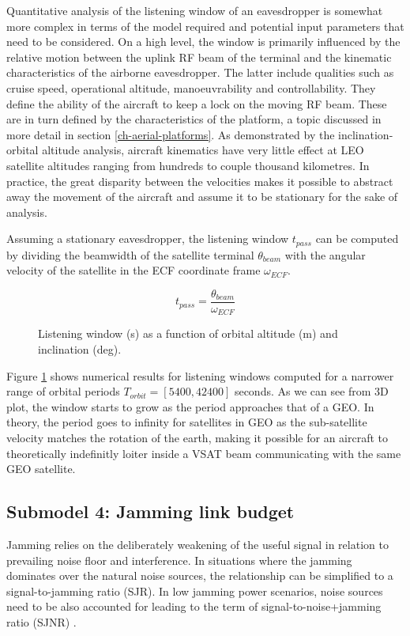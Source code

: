 \documentclass[english, 12pt, a4paper, elec, utf8, a-1b, online]{aaltothesis}
\begin{document}
Quantitative analysis of the listening window of an eavesdropper is somewhat more complex in terms of the model required and potential input parameters that need to be considered.
On a high level, the window is primarily influenced by the relative motion between the uplink RF beam of the terminal and the kinematic characteristics of the airborne eavesdropper.
The latter include qualities such as cruise speed, operational altitude, manoeuvrability and controllability.
They define the ability of the aircraft to keep a lock on the moving RF beam.
These are in turn defined by the characteristics of the platform, a topic discussed in more detail in section \ref{ch-aerial-platforms}.
As demonstrated by the inclination-orbital altitude analysis, aircraft kinematics have very little effect at LEO satellite altitudes ranging from hundreds to couple thousand kilometres.
In practice, the great disparity between the velocities makes it possible to abstract away the movement of the aircraft and assume it to be stationary for the sake of analysis.

Assuming a stationary eavesdropper, the listening window ${t_{pass}}$ can be computed by dividing the beamwidth of the satellite terminal $\theta_{beam}$ with the angular velocity of the satellite in the ECF coordinate frame $\omega_{ECF}$.

\begin{equation}
  t_{pass} = \frac{\theta_{beam}}{\omega_{ECF}}
\end{equation}

\begin{figure}[h]
  \centering
  
  \caption{Listening window (s) as a function of orbital altitude (m) and inclination (deg).}
  \label{fig-listening-window}
\end{figure}

Figure \ref{fig-listening-window} shows numerical results for listening windows computed for a narrower range of orbital periods $T_{orbit} = [5400, 42400]$ seconds.
As we can see from 3D plot, the window starts to grow as the period approaches that of a GEO. In theory, the period goes to infinity for satellites in GEO as the sub-satellite velocity matches the rotation of the earth, making it possible for an aircraft to theoretically indefinitly loiter inside a VSAT beam communicating with the same GEO satellite.

\subsection{Submodel 4: Jamming link budget} \label{ch-results-submodel-4-link-budget}
Jamming relies on the deliberately weakening of the useful signal in relation to prevailing noise floor and interference. In situations where the jamming dominates over the natural noise sources, the relationship can be simplified to a signal-to-jamming ratio (SJR). In low jamming power scenarios, noise sources need to be also accounted for leading to the term of signal-to-noise+jamming ratio (SJNR) \cite{kosola2013digitaalinen}. %
\end{document}
